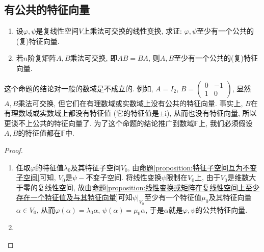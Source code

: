 \documentclass[../../main.tex]{subfiles}
\begin{document}
\subsection{有公共的特征向量}

\begin{proposition}\label{proposition:乘法可交换必有公共的特征向量}
\begin{enumerate}
\item 设\(\varphi,\psi\)是复线性空间\(V\)上乘法可交换的线性变换, 求证: \(\varphi,\psi\)至少有一个公共的(复)特征向量.

\item 若\(n\)阶复矩阵\(A,B\)乘法可交换, 即\(AB = BA\), 则\(A,B\)至少有一个公共的(复)特征向量. 
\end{enumerate}
\end{proposition}
\begin{remark}
这个命题的结论对一般的数域是不成立的. 例如, \(A = I_{2}\), \(B=\begin{pmatrix}
0& -1\\
1& 0
\end{pmatrix}\), 显然\(A,B\)乘法可交换, 但它们在有理数域或实数域上没有公共的特征向量. 事实上, \(B\)在有理数域或实数域上都没有特征值 (它的特征值是\(\pm\mathrm{i}\)), 从而也没有特征向量, 所以更谈不上公共的特征向量了. 为了这个命题的结论推广到数域\(\mathbb{F}\)上, 我们必须假设\(A,B\)的特征值都在\(\mathbb{F}\)中.
\end{remark}
\begin{proof}
\begin{enumerate}
\item 任取\(\varphi\)的特征值\(\lambda_{0}\)及其特征子空间\(V_{0}\), 由\hyperref[proposition:特征子空间互为不变子空间]{命题\ref{proposition:特征子空间互为不变子空间}}可知, \(V_{0}\)是\(\psi -\)不变子空间. 将线性变换\(\psi\)限制在\(V_{0}\)上, 由于\(V_{0}\)是维数大于零的复线性空间, 故由\hyperref[proposition:线性变换或矩阵在复线性空间上至少存在一个特征值及与其特征向量]{命题\ref{proposition:线性变换或矩阵在复线性空间上至少存在一个特征值及与其特征向量}}可知\(\psi|_{V_{0}}\)至少有一个特征值\(\mu_{0}\)及其特征向量\(\alpha \in V_{0}\), 从而\(\varphi(\alpha)=\lambda_{0}\alpha\), \(\psi(\alpha)=\mu_{0}\alpha\), 于是\(\alpha\)就是\(\varphi,\psi\)的公共特征向量. 

\item 
\end{enumerate}
\end{proof}
\end{document}
